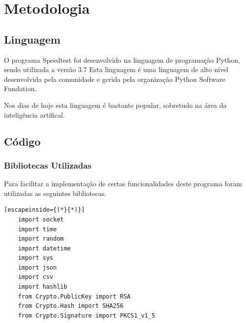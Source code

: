 \documentclass{report}
\begin{document}
\chapter{Metodologia}
\label{chap.metodologia}

\section{Linguagem}
\par O programa Speedtest foi desenvolvido na linguagem de programação Python\cite{python}, sendo utilizada a versão 3.7
Esta linguagem é uma linguagem de alto nível desenvolvida pela comunidade e gerida pela organização Python Software Fundation\cite{pythonorg}.
\par Nos dias de hoje esta linguagem é bastante popular, sobretudo na área da inteligência artifical.
\section{Código}

\subsection{Bibliotecas Utilizadas}
\par Para facilitar a implementação de certas funcionalidades deste programa foram utilizadas as seguintes bibliotecas.
\begin{lstlisting}[escapeinside={(*}{*)}]
    import socket
    import time
    import random
    import datetime
    import sys
    import json
    import csv
    import hashlib
    from Crypto.PublicKey import RSA
    from Crypto.Hash import SHA256
    from Crypto.Signature import PKCS1_v1_5
\end{lstlisting}
\end{document}
